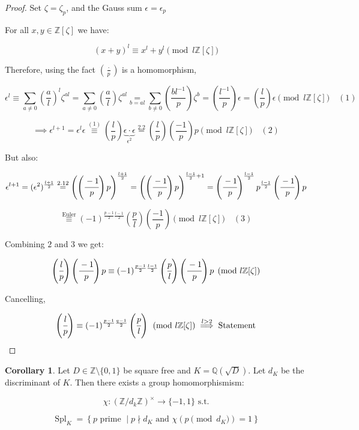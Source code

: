 \documentclass[openany]{amsbook}
\numberwithin{section}{chapter}
\theoremstyle{definition}
\newtheorem{corollary}[theorem]{Corollary}
\begin{document}
\begin{proof}
    Set \(\zeta = \zeta_p\), and the Gauss sum \(\epsilon = \epsilon _ p\) 

    For all \(x,y \in \mathbb{Z} [\zeta]\) we have:

    \[
        (x+y)^l \equiv x^l + y^l \pmod {l\mathbb{Z}[\zeta]}
    \]

    Therefore, using the fact \(\left( \frac{\cdot}{p} \right) \) is a homomorphism, 

    \[
        \epsilon^l \equiv \sum_{a\neq 0}\left( \frac{a}{l} \right) ^ l \zeta ^{al} = \sum_{a\neq 0} \left( \frac{a}{l} \right) \zeta ^{al} \underset{b = al}{=} \sum_{b \neq 0} \left( \frac{bl^{-1}}{p} \right) \zeta ^ b = \left( \frac{l ^{-1}}{p} \right) \epsilon = \left( \frac{l}{p} \right) \epsilon \pmod{l \mathbb{Z} [\zeta]} \quad (1)
    \]

    \[
        \implies \epsilon ^{l+1} = \epsilon^l \epsilon \overset{(1)}{\equiv} \left( \frac{l}{p} \right) \underbrace{\epsilon \cdot \epsilon}_{\epsilon ^2} \overset{2.2}{=} \left( \frac{l}{p} \right) \left( \frac{-1}{p} \right) p \pmod{l \mathbb{Z} [\zeta]} \quad (2)
    \]

    But also:

    \[
        \epsilon ^{l+1} = (\epsilon^2)^{\frac{l+1}{2}} \overset{2.12}{=} \left( \left( \cfrac{-1}{p} \right) p \right) ^{\frac{l+1}{2}} = \left( \left( \cfrac{-1}{p} \right) p \right) ^{\frac{l-1}{2} + 1} = \left( \cfrac{-1}{p} \right) ^{\frac{l-1}{2}} p^{\frac{l-1}{2}} \left( \cfrac{-1}{p} \right) p
    \]

    \[
        \overset{\text{Euler}}{\equiv} (-1)^{\frac{p-1}{2}\frac{l-1}{2}} \left( \frac{p}{l} \right) \left( \frac{-1}{p} \right) \pmod{l \mathbb{Z}[\zeta]} \quad(3)
    \]

    Combining \(2\) and \(3\) we get:

    \[
        \left( \cfrac{l}{p} \right) \left( \cfrac{-1}{p} \right) p \equiv (-1)^{\frac{p-1}{2}\frac{l-1}{2}} \left( \cfrac{p}{l} \right) \left( \cfrac{-1}{p} \right) p \pmod{l\mathbb{Z}[\zeta]} 
    \]

    Cancelling,

    \[
        \left( \cfrac{l}{p} \right) \equiv (-1)^{\frac{p-1}{2}\frac{q-1}{2}} \left( \cfrac{p}{l} \right) \pmod{l\mathbb{Z}[\zeta]} \overset{l > 2}{\implies } \text{Statement} 
    \]

\end{proof}

\begin{corollary}
    Let \(D \in \mathbb{Z} \setminus \{ 0,1 \} \) be square free and \(K = \mathbb{Q} (\sqrt{D}) \). Let \(d_K\) be the discriminant of \(K\). Then there exists a group homomorphismism:

    \[
        \chi : (\mathbb{Z} / d_k \mathbb{Z})^\times \to \{ -1,1 \} \text{ s.t.} 
    \]

    \[
        \operatorname{Spl}_K = \left\{ p \text{ prime } \mid p\nmid d_K \text{ and } \chi(p \pmod{d_K}) = 1 \right\} 
    \]
\end{corollary}
\end{document}

